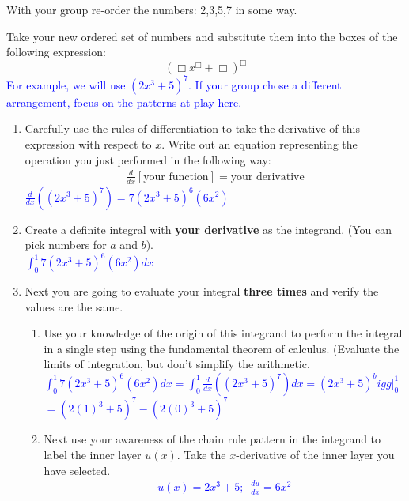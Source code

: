 \documentclass{ximera}
\begin{document}
\begin{exercise}
 With your group re-order the numbers: 2,3,5,7 in some way. 

Take your new ordered set of numbers and substitute them into the boxes of the following expression:
\[(\Box x^\Box +\Box)^\Box\]
\textcolor{blue}{ For example, we will use $(2x^3+5)^7$. If your group chose a different arrangement, focus on the patterns at play here.  }

    \begin{enumerate}
        
        \item Carefully use the rules of differentiation to take the derivative of this expression with respect to $x$. Write out an equation representing the operation you just performed in the following way:
            \begin{align}
	            \frac{d}{dx}\left[ \text{your function}\right] = \text{your derivative} \nonumber
            \end{align}
        \textcolor{blue}{$\frac{d}{dx}\left((2x^3+5)^7\right)=7(2x^3+5)^6(6x^2)$}

        \item Create a definite integral with {\bf{your derivative}} as the integrand. (You can pick numbers for $a$ and $b$). \\
        \textcolor{blue}{$\int_0^1 7(2x^3+5)^6(6x^2)dx$}

        \item Next you are going to evaluate your integral {\bf{three times}} and verify the values are the same.
            \begin{enumerate}
                \item Use your knowledge of the origin of this integrand to perform the integral in a single step using the fundamental theorem of calculus. (Evaluate the limits of integration, but don't simplify the arithmetic.
                \textcolor{blue}{$\int_0^1 7(2x^3+5)^6(6x^2)dx=\int_0^1 \frac{d}{dx}\left((2x^3+5)^7\right)dx=(2x^3+5)^bigg|_0^1$\\
                $=(2(1)^3+5)^7-(2(0)^3+5)^7$}


                \item Next use your awareness of the chain rule pattern in the integrand to label the inner layer $u(x)$. Take the $x$-derivative of the inner layer you have selected.
                \textcolor{blue}{
                    \begin{align}
	                    u(x) = 2x^3+5;\,\,\, \frac{du}{dx} = 6x^2\nonumber
                    \end{align}
                }


\end{enumerate}
\end{enumerate}
\end{exercise}
\end{document}
